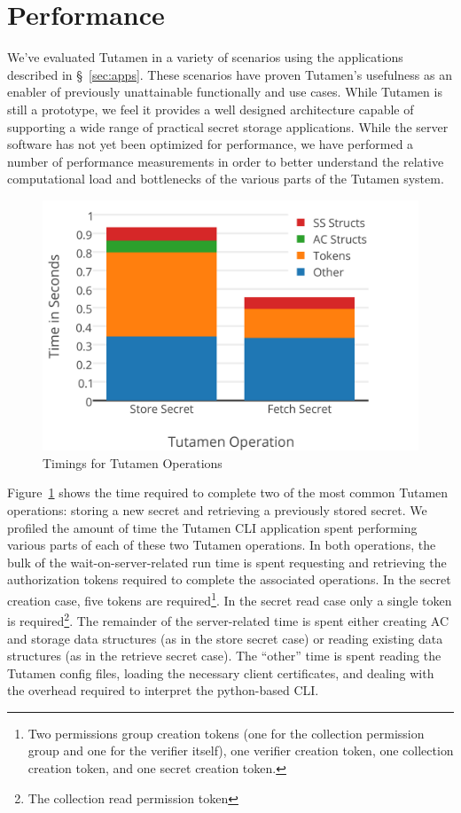 \section{Performance}
\label{sec:performace}

We've evaluated Tutamen in a variety of scenarios using the
applications described in \S~\ref{sec:apps}. These scenarios have
proven Tutamen's usefulness as an enabler of previously unattainable
functionally and use cases. While Tutamen is still a prototype, we
feel it provides a well designed architecture capable of supporting a
wide range of practical secret storage applications. While the server
software has not yet been optimized for performance, we have performed
a number of performance measurements in order to better understand the
relative computational load and bottlenecks of the various parts of
the Tutamen system.

\begin{figure}[th]
  \centering
  \includegraphics[width=\columnwidth]{./figs/png/chart-timings.png}
  \caption{Timings for Tutamen Operations}
  \label{fig:eval:timings}
\end{figure}

Figure~\ref{fig:eval:timings} shows the time required to complete two
of the most common Tutamen operations: storing a new secret and
retrieving a previously stored secret. We profiled the amount of time
the Tutamen CLI application spent performing various parts of each of
these two Tutamen operations. In both operations, the bulk of the
wait-on-server-related run time is spent requesting and retrieving the
authorization tokens required to complete the associated
operations. In the secret creation case, five tokens are
required\footnote{Two permissions group creation tokens (one for the
  collection permission group and one for the verifier itself), one
  verifier creation token, one collection creation token, and one
  secret creation token.}. In the secret read case only a single token
is required\footnote{The collection read permission token}. The
remainder of the server-related time is spent either creating AC and
storage data structures (as in the store secret case) or reading
existing data structures (as in the retrieve secret case). The
``other'' time is spent reading the Tutamen config files, loading the
necessary client certificates, and dealing with the overhead required
to interpret the python-based CLI.


